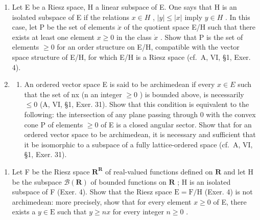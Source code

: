 \begin{enumerate}
\def\labelenumi{\arabic{enumi})}
\setcounter{enumi}{3}
\item
  Let E be a Riesz space, H a linear subspace of E. One says that H is an isolated subspace of E if the relations \(x \in H\) , \(|y| \leqslant |x|\) imply \(y \in H\) . In this case, let P be the set of elements \(\dot{x}\) of the quotient space E/H such that there exists at least one element \(x \geqslant 0\) in the class \(\dot{x}\) . Show that P is the set of elements \(\geqslant 0\) for an order structure on E/H, compatible with the vector space structure of E/H, for which E/H is a Riesz space (cf.~A, VI, §1, Exer. 4).
\item
  \begin{enumerate}
  \def\labelenumii{\alph{enumii})}
  \tightlist
  \item
    An ordered vector space E is said to be archimedean if every \(x \in E\) such that the set of nx (n an integer \(\geqslant 0\) ) is bounded above, is necessarily \(\leqslant 0\) (A, VI, §1, Exer. 31). Show that this condition is equivalent to the following: the intersection of any plane passing through 0 with the convex cone P of elements \(\geqslant 0\) of E is a closed angular sector. Show that for an ordered vector space to be archimedean, it is necessary and sufficient that it be isomorphic to a subspace of a fully lattice-ordered space (cf.~A, VI, §1, Exer. 31).
  \end{enumerate}
\end{enumerate}

\begin{enumerate}
\def\labelenumi{\alph{enumi})}
\setcounter{enumi}{1}
\tightlist
\item
  Let F be the Riesz space \(\mathbf{R}^{\mathbf{R}}\) of real-valued functions defined on \(\mathbf{R}\) and let H be the subspace \(\mathcal{B}(\mathbf{R})\) of bounded functions on \(\mathbf{R}\) ; H is an isolated subspace of F (Exer. 4). Show that the Riesz space \(\mathrm{E} = \mathrm{F} / \mathrm{H}\) (Exer. 4) is not archimedean: more precisely, show that for every element \(x \geqslant 0\) of E, there exists a \(y \in \mathrm{E}\) such that \(y \geqslant nx\) for every integer \(n \geqslant 0\) .
\end{enumerate}

